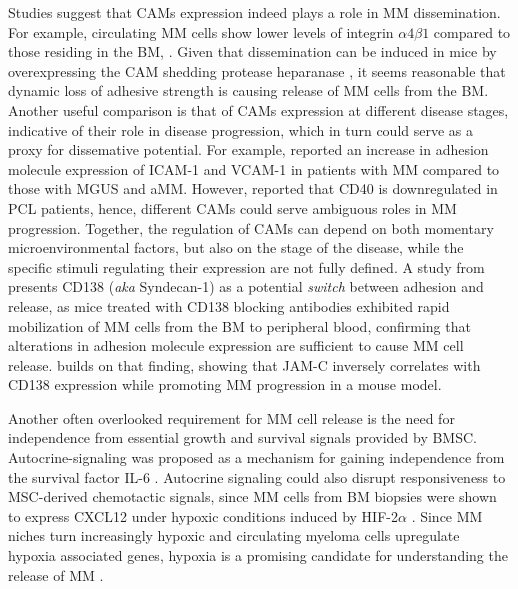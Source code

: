 Studies suggest that \acp{CAM} expression indeed plays a role in \ac{MM}
dissemination. For example, circulating \ac{MM} cells show lower levels of
integrin $\alpha4\beta1$ compared to those residing in the \ac{BM},
\cite{paivaDetailedCharacterizationMultiple2013,
    paivaCompetitionClonalPlasma2011}. Given that dissemination can be induced in
mice by overexpressing the \ac{CAM} shedding protease heparanase
\cite{yangHeparanasePromotesSpontaneous2005}, it seems reasonable that dynamic
loss of adhesive strength is causing release of \ac{MM} cells from the \ac{BM}.
Another useful comparison is that of \acp{CAM} expression at different disease
stages, indicative of their role in disease progression, which in turn could
serve as a proxy for dissemative potential. For example,
\citet{terposIncreasedCirculatingVCAM12016}
reported an increase in adhesion molecule expression of ICAM-1 and VCAM-1 in
patients with \ac{MM} compared to those with \ac{MGUS} and \ac{aMM}. However,
\citet{perez-andresClonalPlasmaCells2005} reported that CD40 is downregulated in
\ac{PCL} patients, hence, different \acp{CAM} could serve ambiguous roles in
\ac{MM} progression. Together, the regulation of \acp{CAM} can depend on both
momentary microenvironmental factors, but also on the stage of the disease,
while the specific stimuli regulating their expression are not fully defined. A
study from \citet{akhmetzyanovaDynamicCD138Surface2020} presents CD138
(\textit{aka} Syndecan-1) as a potential \textit{switch} between adhesion and
release, as mice treated with CD138 blocking antibodies exhibited
rapid mobilization of \ac{MM} cells from the \ac{BM} to peripheral blood,
confirming that alterations in adhesion molecule expression are sufficient to
cause \ac{MM} cell release. \citet{brandlJunctionalAdhesionMolecule2022}
builds on that finding, showing that JAM-C inversely correlates with CD138
expression while promoting \ac{MM} progression in a mouse model.


Another often overlooked requirement for \ac{MM} cell release is the need for
independence from essential growth and survival signals provided by \ac{BMSC}.
Autocrine-signaling was proposed as a mechanism for gaining independence from
the survival factor IL-6 \cite{frassanitoAutocrineInterleukin6Production2001,
urashimaCD40LigandTriggered1995}. Autocrine signaling could also disrupt
responsiveness to \ac{MSC}-derived chemotactic signals, since \ac{MM} cells from
\ac{BM} biopsies were shown to express CXCL12 under hypoxic conditions induced
by HIF-2$\alpha$ \cite{martinHypoxiainducibleFactor2Novel2010}. Since \ac{MM}
niches turn increasingly hypoxic and circulating myeloma cells upregulate
hypoxia associated genes, hypoxia is a promising candidate for understanding the
release of \ac{MM} \cite{garcesTranscriptionalProfilingCirculating2020}.


